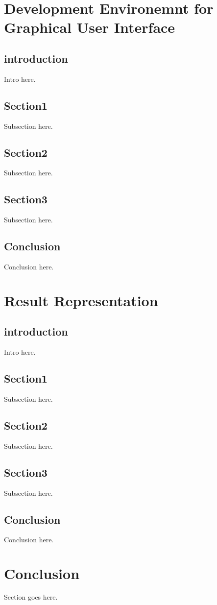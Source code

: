 \documentclass[journal,10pt,onecolumn,compsoc]{IEEEtran} \usepackage[margin=1.0in]{geometry} \usepackage{pdfpages} \usepackage{graphicx}
\begin{document}
\section{Development Environemnt for Graphical User Interface}
\subsection{introduction}
Intro here.
\subsection{Section1}
Subsection here.
\subsection{Section2}
Subsection here.
\subsection{Section3}
Subsection here.
\subsection{Conclusion}
Conclusion here.

\newpage

\section{Result Representation}
\subsection{introduction}
Intro here.
\subsection{Section1}
Subsection here.
\subsection{Section2}
Subsection here.
\subsection{Section3}
Subsection here.
\subsection{Conclusion}
Conclusion here.

\newpage

\section{Conclusion}
Section goes here.
\newpage



\end{document}
